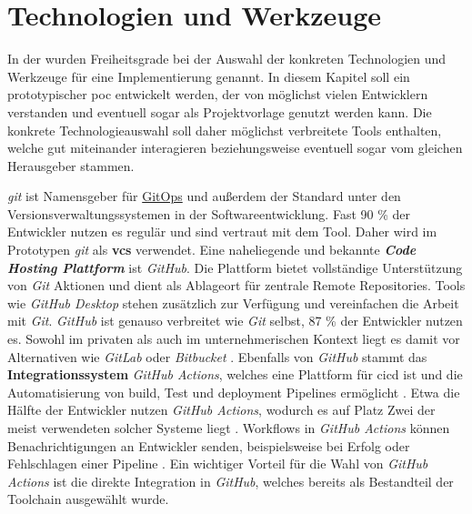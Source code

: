 \section{Technologien und Werkzeuge}
\label{sec:06-01_technologies-and-tools}

In der  wurden Freiheitsgrade bei der Auswahl der konkreten Technologien und Werkzeuge für eine Implementierung genannt. In diesem Kapitel soll ein prototypischer \Gls{poc} entwickelt werden, der von möglichst vielen Entwicklern verstanden und eventuell sogar als Projektvorlage genutzt werden kann. Die konkrete Technologieauswahl soll daher möglichst verbreitete Tools enthalten, welche gut miteinander interagieren beziehungsweise eventuell sogar vom gleichen Herausgeber stammen.

\textit{\Gls{git}} ist Namensgeber für \hyperref[sec:03-03_gitops-as-further-evolution]{GitOps} und außerdem der Standard unter den Versionsverwaltungssystemen in der Softwareentwicklung. Fast 90 \% der Entwickler nutzen es regulär \cite{207:Developer-Ecosystem} und sind vertraut mit dem Tool. Daher wird im Prototypen \textit{\Gls{git}} als \textbf{\Gls{vcs}} verwendet. Eine naheliegende und bekannte \textbf{\textit{Code Hosting Plattform}} ist \textit{GitHub}. Die Plattform bietet vollständige Unterstützung von \textit{Git} Aktionen und dient als Ablageort für zentrale Remote Repositories. Tools wie \textit{GitHub Desktop} stehen zusätzlich zur Verfügung und vereinfachen die Arbeit mit \textit{Git}. \cite{301:About-GitHub-and-Git} \textit{GitHub} ist genauso verbreitet wie \textit{Git} selbst, 87 \% der Entwickler nutzen es. Sowohl im privaten als auch im unternehmerischen Kontext liegt es damit vor Alternativen wie \textit{GitLab} oder \textit{Bitbucket} \cite{207:Developer-Ecosystem}. Ebenfalls von \textit{GitHub} stammt das \textbf{Integrationssystem} \textit{GitHub Actions}, welches eine Plattform für \Gls{cicd} ist und die Automatisierung von \Gls{build}, Test und \Gls{deployment} Pipelines ermöglicht \cite{302:Understanding-GitHub-Actions}. Etwa die Hälfte der Entwickler nutzen \textit{GitHub Actions}, wodurch es auf Platz Zwei der meist verwendeten solcher Systeme liegt \cite{207:Developer-Ecosystem}. Workflows in \textit{GitHub Actions} können Benachrichtigungen an Entwickler senden, beispielsweise bei Erfolg oder Fehlschlagen einer Pipeline \cite{307:Notifications-for-Workflow-Runs}. Ein wichtiger Vorteil für die Wahl von \textit{GitHub Actions} ist die direkte Integration in \textit{GitHub}, welches bereits als Bestandteil der Toolchain ausgewählt wurde.

